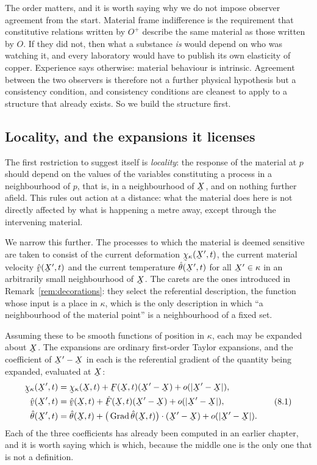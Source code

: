 The order matters, and it is worth saying why we do not impose observer
agreement from the start. Material frame indifference is the
requirement that constitutive relations written by $O^{+}$ describe the
same material as those written by $O$. If they did not, then what a
substance \emph{is} would depend on who was watching it, and every
laboratory would have to publish its own elasticity of copper. Experience
says otherwise: material behaviour is intrinsic. Agreement between the
two observers is therefore not a further physical hypothesis but a
consistency condition, and consistency conditions are cleanest to apply
to a structure that already exists. So we build the structure first.

\subsection*{Locality, and the expansions it licenses}

The first restriction to suggest itself is \emph{locality}: the response
of the material at $p$ should depend on the values of the variables
constituting a process in a neighbourhood of $p$, that is, in a
neighbourhood of $\bX$, and on nothing further afield. This rules out
action at a distance: what the material does here is not directly
affected by what is happening a metre away, except through the
intervening material.

We narrow this further. The processes to which the material is deemed
sensitive are taken to consist of the current deformation
$\bchi_{\kappa}(\bX',t)$, the current material velocity
$\hat\bv(\bX',t)$ and the current temperature $\hat\theta(\bX',t)$ for
all $\bX'\in\kappa$ in an arbitrarily small neighbourhood of $\bX$. The
carets are the ones introduced in Remark~\ref{rem:decorations}: they
select the referential description, the function whose input is a place
in $\kappa$, which is the only description in which ``a neighbourhood of
the material point'' is a neighbourhood of a fixed set.

Assuming these to be smooth functions of position in $\kappa$, each may
be expanded about $\bX$. The expansions are ordinary first-order Taylor
expansions, and the coefficient of $\bX'-\bX$ in each is the referential
gradient of the quantity being expanded, evaluated at $\bX$:
\begin{equation}
\begin{aligned}
   \bchi_{\kappa}(\bX',t)&=\bchi_{\kappa}(\bX,t)+\bF(\bX,t)(\bX'-\bX)
     +o(|\bX'-\bX|),\\
   \hat\bv(\bX',t)&=\hat\bv(\bX,t)+\dot\bF(\bX,t)(\bX'-\bX)
     +o(|\bX'-\bX|),\\
   \hat\theta(\bX',t)&=\hat\theta(\bX,t)
     +\ip{\big(\Grad\hat\theta(\bX,t)\big)}{(\bX'-\bX)}
     +o(|\bX'-\bX|).
\end{aligned}
   \tag{8.1}\label{eq:8.1}
\end{equation}
Each of the three coefficients has already been computed in an earlier
chapter, and it is worth saying which is which, because the middle one
is the only one that is not a definition.


